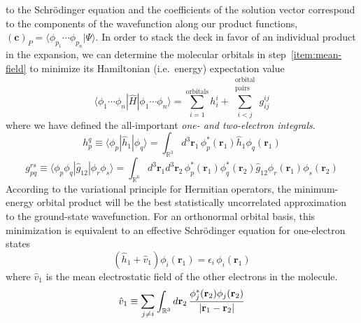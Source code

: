to the Schr\"odinger equation and the coefficients of the solution vector
correspond to the components of the wavefunction along our product functions,
\(
    (\mathbf{c})_P
    =
    \langle \phi_{p_1}\cdots \phi_{p_n}|\Psi\rangle
\).
In order to stack the deck in favor of an individual product in the expansion,
we can determine the molecular orbitals in step~\ref{item:mean-field} to
minimize its Hamiltonian (i.e.~energy) expectation value
\begin{equation}
    \label{eq:introduction:orbital-product-expectation-value}
    \langle \phi_1\cdots \phi_n|
    \hat{H}
    |\phi_1\cdots \phi_n \rangle
    =
    \sum_{i=1}^\mathrm{orbitals}
    h_i^i
    +
    \sum_{i<j}^{\substack{\mathrm{orbital}\\\mathrm{pairs}}}
    g_{ij}^{ij}
\end{equation}
where we have defined the all-important {\itshape one- and two-electron
integrals}.
\begin{equation}
    h_p^q
    \equiv
    \langle\phi_p|\hat{h}_1|\phi_q\rangle
    =
    \int_{\mathbb{R}^3}
    d^3\mathbf{r}_1\,
    \phi_p^*(\mathbf{r}_1)
    \hat{h}_1
    \phi_q(\mathbf{r}_1)
\end{equation}
\begin{equation}
    g_{pq}^{rs}
    \equiv
    \langle\phi_p\phi_q|\hat{g}_{12}|\phi_r\phi_s\rangle
    =
    \int_{\mathbb{R}^6}
    d^3\mathbf{r}_1
    d^3\mathbf{r}_2\,
    \phi_p^*(\mathbf{r}_1)
    \phi_q^*(\mathbf{r}_2)
    \hat{g}_{12}
    \phi_r(\mathbf{r}_1)
    \phi_s(\mathbf{r}_2)
\end{equation}
According to the variational principle for Hermitian operators, the
minimum-energy orbital product will be the best statistically uncorrelated
approximation to the ground-state wavefunction.
For an orthonormal orbital basis, this minimization is equivalent to an
effective Schr\"odinger equation for one-electron states
\begin{equation}
    \label{eq:introduction:mean-field-orbitals}
    (
        \hat{h}_1
        +
        \hat{v}_1
    )
    \phi_i(\mathbf{r}_1)
    =
    \epsilon_i\,
    \phi_i(\mathbf{r}_1)
\end{equation}
where \(\hat{v}_1\) is the mean electrostatic field of the other electrons in
the molecule.
\begin{equation}
    \hat{v}_1
    \equiv
    \sum_{j\neq i}
    \int_{\mathbb{R}^3}
    d\mathbf{r}_2\,
    \frac{%
        \phi_j^*(\mathbf{r}_2)\phi_j(\mathbf{r}_2)
    }{%
        |\mathbf{r}_1 - \mathbf{r}_2|
    }
\end{equation}
